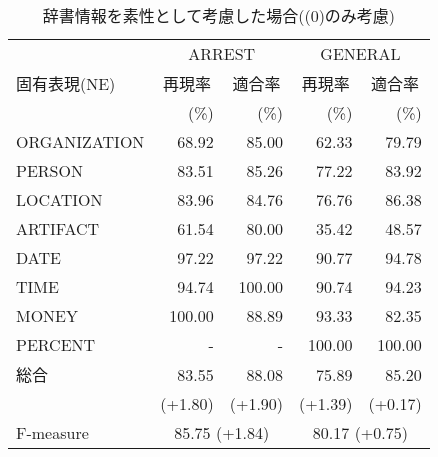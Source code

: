 {\scriptsize
\begin{table*}[htbp]
  \begin{center}
    \caption{辞書情報を素性として考慮した場合((0)のみ考慮)}
    \label{Comparison5} 
    \begin{tabular}{|l|r@{ }r|r@{ }r|}
      \hline
      & \multicolumn{2}{c|}{ARREST} 
      & \multicolumn{2}{c|}{GENERAL}\\
      \cline{2-5}
      固有表現(NE) & \multicolumn{1}{c}{再現率} 
      & \multicolumn{1}{c|}{適合率} & \multicolumn{1}{c}{再現率} 
      & \multicolumn{1}{c|}{適合率} \\
      & (\%) & (\%) & (\%) & (\%) \\
      \hline      
      ORGANIZATION &  68.92 &  85.00 &  62.33 &  79.79\\
      PERSON       &  83.51 &  85.26 &  77.22 &  83.92\\
      LOCATION     &  83.96 &  84.76 &  76.76 &  86.38\\
      ARTIFACT     &  61.54 &  80.00 &  35.42 &  48.57\\
      DATE         &  97.22 &  97.22 &  90.77 &  94.78\\
      TIME         &  94.74 & 100.00 &  90.74 &  94.23\\
      MONEY        & 100.00 &  88.89 &  93.33 &  82.35\\
      PERCENT      &      - &      - & 100.00 & 100.00\\
      \hline
      総合 & 83.55 & 88.08 & 75.89 & 85.20\\
      & (+1.80) & (+1.90) & (+1.39) & (+0.17) \\
      \hline
      \hline
      F-measure & \multicolumn{2}{c|}{85.75 (+1.84)} 
      & \multicolumn{2}{c|}{80.17 (+0.75)} \\
      \hline
    \end{tabular}
  \end{center}


\end{table*}}
